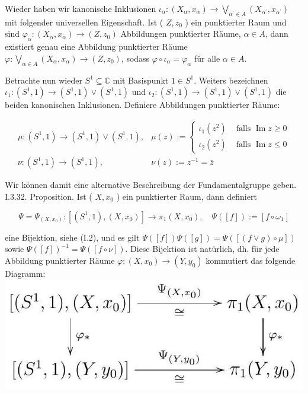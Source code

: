 \documentclass[10pt]{article}
\begin{document}
Wieder haben wir kanonische Inklusionen $\iota_{\alpha}:\left(X_{\alpha}, x_{\alpha}\right) \rightarrow \bigvee_{\alpha^{\prime} \in A}\left(X_{\alpha^{\prime}}, x_{\alpha^{\prime}}\right)$ mit folgender universellen Eigenschaft. Ist ( $Z, z_{0}$ ) ein punktierter Raum und sind $\varphi_{\alpha}:\left(X_{\alpha}, x_{\alpha}\right) \rightarrow\left(Z, z_{0}\right)$ Abbildungen punktierter Räume, $\alpha \in A$, dann existiert genau eine Abbildung punktierter Räume $\varphi: \bigvee_{\alpha \in A}\left(X_{\alpha}, x_{\alpha}\right) \rightarrow\left(Z, z_{0}\right)$, sodass $\varphi \circ \iota_{\alpha}=\varphi_{\alpha}$ für alle $\alpha \in A$.

Betrachte nun wieder $S^{1} \subseteq \mathbb{C}$ mit Basispunkt $1 \in S^{1}$. Weiters bezeichnen $\iota_{1}:\left(S^{1}, 1\right) \rightarrow\left(S^{1}, 1\right) \vee\left(S^{1}, 1\right)$ und $\iota_{2}:\left(S^{1}, 1\right) \rightarrow\left(S^{1}, 1\right) \vee\left(S^{1}, 1\right)$ die beiden kanonischen Inklusionen. Definiere Abbildungen punktierter Räume:

$$
\begin{array}{ll}
\mu:\left(S^{1}, 1\right) \rightarrow\left(S^{1}, 1\right) \vee\left(S^{1}, 1\right), & \mu(z):= \begin{cases}\iota_{1}\left(z^{2}\right) & \text { falls } \operatorname{Im} z \geq 0 \\
\iota_{2}\left(z^{2}\right) & \text { falls } \operatorname{Im} z \leq 0\end{cases} \\
\nu:\left(S^{1}, 1\right) \rightarrow\left(S^{1}, 1\right), & \nu(z):=z^{-1}=\bar{z}
\end{array}
$$

Wir können damit eine alternative Beschreibung der Fundamentalgruppe geben.\\
I.3.32. Proposition. Ist ( $X, x_{0}$ ) ein punktierter Raum, dann definiert

$$
\Psi=\Psi_{\left(X, x_{0}\right)}:\left[\left(S^{1}, 1\right),\left(X, x_{0}\right)\right] \rightarrow \pi_{1}\left(X, x_{0}\right), \quad \Psi([f]):=\left[f \circ \omega_{1}\right]
$$

eine Bijektion, siehe (I.2), und es gilt $\Psi([f]) \Psi([g])=\Psi([(f \vee g) \circ \mu])$ sowie $\Psi([f])^{-1}=\Psi([f \circ \nu])$. Diese Bijektion ist natürlich, dh. für jede Abbildung punktierter Räume $\varphi:\left(X, x_{0}\right) \rightarrow\left(Y, y_{0}\right)$ kommutiert das folgende Diagramm:\\
\includegraphics[max width=\textwidth, center]{2025_06_05_d7ed2bacd1e9ce1db1f0g-032}
\end{document}
